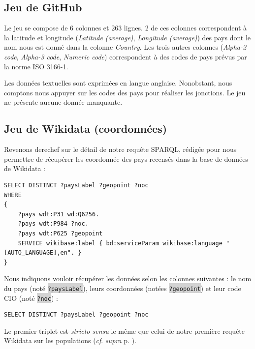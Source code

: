 \documentclass[hidelinks, 12pt]{report}
\newcommand{\code}[1]{\colorbox{LightGray}{\texttt{#1}}}
\begin{document}
%





\subsection{Jeu de GitHub}

Le jeu se compose de 6 colonnes et 263 lignes. 2 de ces colonnes correspondent à la latitude et longitude (\textit{Latitude (average)}, \textit{Longitude (average)}) des pays dont le nom nous est donné dans la colonne \textit{Country}. Les trois autres colonnes (\textit{Alpha-2 code}, \textit{Alpha-3 code}, \textit{Numeric code}) correspondent à des codes de pays prévus par la norme ISO 3166-1.

Les données textuelles sont exprimées en langue anglaise. Nonobstant, nous comptons nous appuyer sur les codes des pays pour réaliser les jonctions. Le jeu ne présente aucune donnée manquante. 





%





\subsection{Jeu de Wikidata (coordonnées)}

Revenons derechef sur le détail de notre requête SPARQL, rédigée pour nous permettre de récupérer les coordonnée des pays recensés dans la base de données de Wikidata :

\begin{lstlisting}[language=SPARQL]
SELECT DISTINCT ?paysLabel ?geopoint ?noc
WHERE 
{
	?pays wdt:P31 wd:Q6256.
	?pays wdt:P984 ?noc.
	?pays wdt:P625 ?geopoint
	SERVICE wikibase:label { bd:serviceParam wikibase:language "[AUTO_LANGUAGE],en". }
}
\end{lstlisting}

Nous indiquons vouloir récupérer les données selon les colonnes suivantes : le nom du pays (noté \code{?paysLabel}), leurs coordonnées (notées \code{?geopoint}) et leur code CIO (noté \code{?noc}) :

\begin{lstlisting}[language=SPARQL]
	SELECT DISTINCT ?paysLabel ?geopoint ?noc
\end{lstlisting}

Le premier triplet est \textit{stricto sensu} le même que celui de notre première requête Wikidata sur les populations (\textit{cf}. \textit{supra} p. \pageref{query1}).
\end{document}
